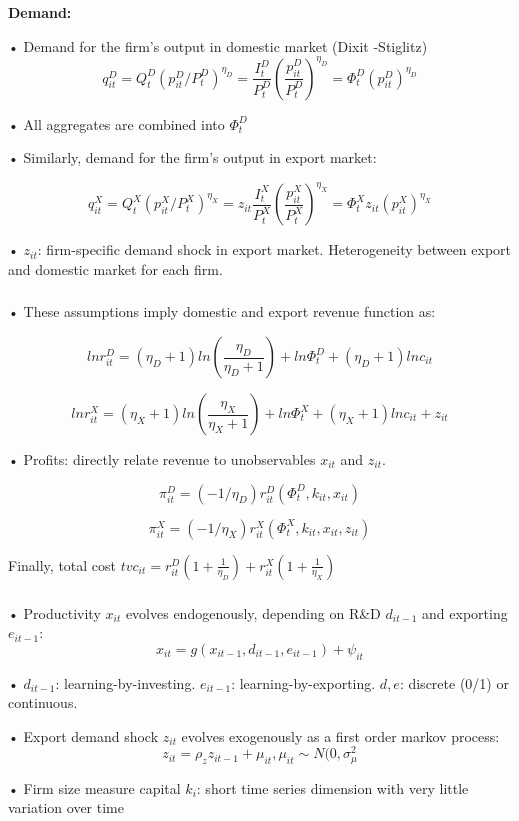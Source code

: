 \documentclass[c, dvipsnames]{beamer}  %
\begin{document}
\begin{frame}[shrink=3]
\frametitle{\insertsection} 


\textbf{Demand:}

• Demand for the firm’s output in domestic market (Dixit -Stiglitz)
$$q^D_{it} = Q^D_t(p^D_{it} /P^D_t)^{\eta_D} = \dfrac{I^D_t}{P^D_t} \left( \dfrac{p^D_{it}}{P^D_t} \right)^{\eta_D} = \Phi^D_t (p^D_{it} )^{\eta_D}$$ 

• All aggregates are combined into $\Phi^D_t$

• Similarly, demand for the firm’s output in export market:

$$q^X_{it} = Q^X_t(p^X_{it} /P^X_t)^{\eta_X} = z_{it} \dfrac{I^X_t}{P^X_t} \left( \dfrac{p^X_{it}}{P^X_t} \right)^{\eta_X} = \Phi^X_t z_{it} (p^X_{it} )^{\eta_X}$$ 


• $z_{it}$: firm-specific demand shock in export market. Heterogeneity
between export and domestic market for each firm.

\end{frame}

\begin{frame}[shrink=3]
\frametitle{\insertsection} 

• These assumptions imply domestic and export revenue function as:

$$ln r^D_{it} = (\eta_D + 1) ln( \frac{\eta_D}{\eta_D + 1}) + ln \Phi^D_t + (\eta_D + 1)lnc_{it}$$

$$ln r^X_{it} = (\eta_X + 1) ln( \frac{\eta_X}{\eta_X + 1}) + ln \Phi^X_t + (\eta_X + 1)lnc_{it} + z_{it}$$

• Profits: directly relate revenue to unobservables $x_{it}$ and $z_{it}$.

$$\pi^D_{it} = (−1/\eta_D)r^D_{it} (\Phi^D_t, k_{it}, x_{it})$$

$$\pi^X_{it} = (−1/\eta_X)r^X_{it} (\Phi^X_t, k_{it}, x_{it}, z_{it})$$



Finally, total cost $tvc_{it} = r^D_{it} (1 + \frac{1}{\eta_D}) + r^X_{it} (1 + \frac{1}{\eta_X})$

\end{frame}




\begin{frame}[shrink=3]
\frametitle{\insertsection} 

• Productivity $x_{it}$ evolves endogenously, depending on R\&D $d_{it−1}$
and exporting $e_{it−1}$:
$$x_{it} = g(x_{it−1}, d_{it−1}, e_{it−1}) + \psi_{it}$$

• $d_{it−1}$: learning-by-investing. $e_{it−1}$: learning-by-exporting. $d, e$: discrete (0/1) or continuous.

• Export demand shock $z_{it}$ evolves exogenously as a first order markov process:
$$z_{it} = \rho_z z_{it−1} + \mu_{it}, \mu_{it} \sim N(0, \sigma^2_{\mu}$$

• Firm size measure capital $k_i$: short time series dimension with very little variation over time


\end{frame}
\end{document}
